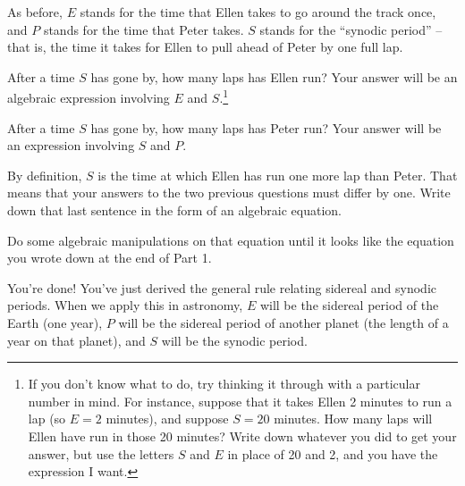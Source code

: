 As before, $E$ stands for the time that Ellen takes to go around
the track once, and $P$ stands for the time that Peter takes. $S$
stands for the ``synodic period'' -- that is, the time it takes for
Ellen to pull ahead of Peter by one full lap.

After a time $S$ has gone by, how many laps has Ellen run? Your
answer will be an algebraic expression involving $E$ and $S$.\footnote{If
you don't know what to do, try thinking it through with a particular
number in mind. For instance, suppose that it takes Ellen 2 minutes
to run a lap (so $E=2$ minutes), and suppose $S=20$ minutes. How
many laps will Ellen have run in those 20 minutes? 
Write down whatever you did to get your answer, but use the letters
$S$ and $E$ in place of 20 and 2, and you have the expression I want.}

\vskip 1.5in

After a time $S$ has gone by, how many laps has Peter run?
Your answer will be an expression involving $S$ and $P$. 

\vskip 1.5in


By definition, $S$ is the time at which Ellen has run one more
lap than Peter. That means that your answers to the two previous
questions must differ by one. Write down that last sentence in
the form of an algebraic equation.

\eject

Do some algebraic manipulations on that equation until
it looks like the equation you wrote down at the end of Part 1.



\vfil

You're done! You've just derived the general rule relating sidereal
and synodic periods. When we apply this in astronomy, $E$ will
be the sidereal period of the Earth (one year), $P$ will be the sidereal
period of another planet (the length of a year on that planet), and 
$S$ will be the synodic period.

